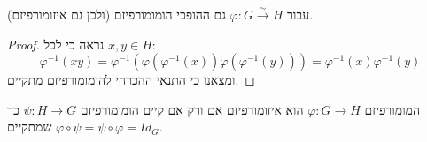 \begin{lemma}
	עבור $\varphi : G \xrightarrow{\sim} H$ גם ההופכי הומומורפיזם (ולכן גם איזומורפיזם).
\end{lemma}
\begin{proof}
	נראה כי לכל $x, y \in H$:
	\[
		\varphi^{-1}(xy)
		= \varphi^{-1}(\varphi(\varphi^{-1}(x)) \varphi(\varphi^{-1}(y)))
		= \varphi^{-1}(x) \varphi^{-1}(y)
	\]
	ומצאנו כי התנאי ההכרחי להומומורפיזם מתקיים.
\end{proof}

\begin{conclusion}
	המומורפיזם $\varphi : G \to H$ הוא איזומורפיזם אם ורק אם קיים הומומורפיזם $\psi : H \to G$ כך שמתקיים $\varphi \circ \psi = \psi \circ \varphi = Id_G$.
\end{conclusion}

